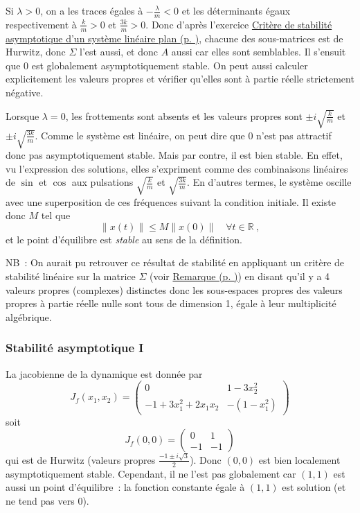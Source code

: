 Si \(\lambda>0\), on a les traces égales à \(-\frac{\lambda}{m}<0\) et
les déterminants égaux respectivement à \(\frac{k}{m}>0\) et
\(\frac{3k}{m}>0\). Donc d'après l'exercice
\protect\hyperlink{answer-crit_stab_dim2}{Critère de stabilité
asymptotique d'un système linéaire plan (p. \pageref*{answer-crit_stab_dim2})},
chacune des sous-matrices est de Hurwitz, donc \(\Sigma\) l'est aussi,
et donc \(A\) aussi car elles sont semblables. Il s'ensuit que 0 est
globalement asymptotiquement stable. On peut aussi calculer
explicitement les valeurs propres et vérifier qu'elles sont à partie
réelle strictement négative.

Lorsque \(\lambda=0\), les frottements sont absents et les valeurs
propres sont \(\pm i \sqrt{\frac{k}{m}}\) et
\(\pm i \sqrt{\frac{3k}{m}}\). Comme le système est linéaire, on peut
dire que 0 n'est pas attractif donc pas asymptotiquement stable. Mais par
contre, il est bien stable. En effet, vu l'expression des solutions,
elles s'expriment comme des combinaisons linéaires de \(\sin\) et
\(\cos\) aux pulsations \(\sqrt{\frac{k}{m}}\) et
\(\sqrt{\frac{3k}{m}}\). En d'autres termes, le système oscille avec une
superposition de ces fréquences suivant la condition initiale. Il existe
donc \(M\) tel que \[
\|x(t)\|\leq M \|x(0)\| \quad \forall t \in \mathbb{R}\ ,
\] et le point d'équilibre est \emph{stable} au sens de la définition.

NB~: On aurait pu retrouver ce résultat de stabilité en appliquant un
critère de stabilité linéaire sur la matrice \(\Sigma\) (voir
\protect\hyperlink{rem-crit_stabLin}{Remarque (p.
\pageref*{rem-crit_stabLin})}) en disant qu'il y a 4 valeurs propres
(complexes) distinctes donc les sous-espaces propres des valeurs propres
à partie réelle nulle sont tous de dimension 1, égale à leur
multiplicité algébrique.

\hypertarget{answer-asymp_glob-1}{%
\subsubsection*{Stabilité asymptotique I}\label{answer-asymp_glob-1}}


La jacobienne de la dynamique est donnée par \[
J_f(x_1,x_2) = 
\left(
\begin{matrix}
0 & 1-3x_2^2 \\
-1+3x_1^2+2x_1x_2 & -(1-x_1^2)
\end{matrix}
\right)
\] soit \[
J_f(0,0) = 
\left(
\begin{matrix}
0 & 1 \\
-1 & -1
\end{matrix}
\right)
\] qui est de Hurwitz (valeurs propres \(\frac{-1\pm i \sqrt{3}}{2}\)).
Donc \((0,0)\) est bien localement asymptotiquement stable. Cependant,
il ne l'est pas globalement car \((1,1)\) est aussi un point
d'équilibre~: la fonction constante égale à \((1,1)\) est solution (et
ne tend pas vers 0).

